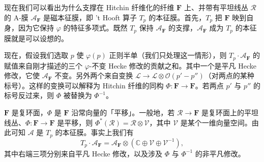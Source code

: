 
现在我们可以看出为什么支撑在 Hitchin 纤维化的纤维 $\boldsymbol{F}$ 上、并带有平坦线丛 $\mathcal{R}$ 的 A-膜 $\mathcal{A}_{\boldsymbol{F}}$ 是磁本征膜，即 't Hooft 算子 $T_p$ 的本征膜。首先，$T_p$ 把 $\boldsymbol{F}$ 映到自身，因为它保持 $\varphi$ 的特征多项式。既然 $T_p$ 保持 $\mathcal{A}_{\boldsymbol{F}}$ 的支撑，$\mathcal{A}_{\boldsymbol{F}}$ 成为 $T_p$ 的本征膜就是可以设想的。

现在，假设我们选取 $p$ 使 $\varphi(p)$ 正则半单（我们只处理这一情形），则 $T_p\cdot\mathcal{A}_{\boldsymbol{F}}$ 的赋值来自刚才描述的三个 $\varphi$-不变 Hecke 修改的贡献之和。其中一个是平凡 Hecke 修改，它使 $\mathcal{A}_{\boldsymbol{F}}$ 不变。另外两个来自变换 $\mathcal{L}\to\mathcal{L}\otimes\mathcal{O}(p'-p'')$（对两点的某种标号）。这样的变换可以解释为 Hitchin 纤维的同构 $\Phi:\boldsymbol{F}\to\boldsymbol{F}$。若两点 $p'$ 与 $p''$ 的标号反过来，则 $\Phi$ 被替换为 $\Phi^{-1}$。

$\boldsymbol{F}$ 是复环面，$\Phi$ 是 $\boldsymbol{F}$ 沿常向量的「平移」。一般地，若 $\mathcal{R}\to\boldsymbol{F}$ 是复环面上的平坦线丛、$\Phi:\boldsymbol{F}\to\boldsymbol{F}$ 是平移，则 $\Phi^*(\mathcal{R})=\mathcal{R}\otimes\mathcal{V}$，其中 $\mathcal{V}$ 是某个一维向量空间。由此可知 $\mathcal{A}$ 是 $T_p$ 的本征膜。事实上我们有
\begin{equation}\tag{5.28}
T_p\cdot\mathcal{A}_{\boldsymbol{F}}=\mathcal{A}_{\boldsymbol{F}}\otimes(\mathbb{C}\oplus\mathcal{V}\oplus\mathcal{V}^{-1}),
\end{equation}
其中右端三项分别来自平凡 Hecke 修改，以及涉及 $\Phi$ 与 $\Phi^{-1}$ 的非平凡修改。



